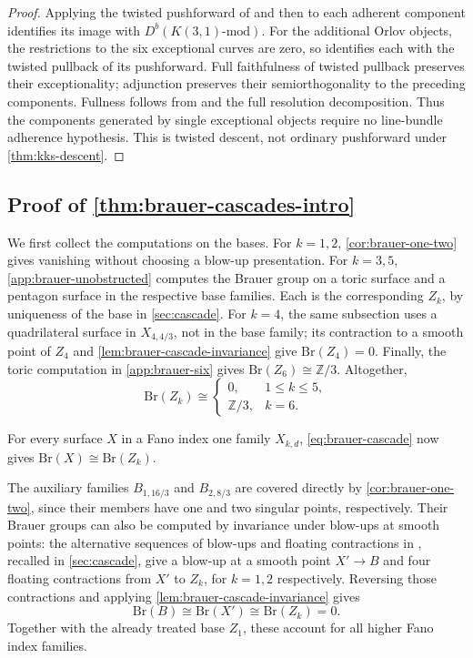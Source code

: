 \documentclass[11pt]{article}
\theoremstyle{plain}
\theoremstyle{definition}
\theoremstyle{remark}
\newcommand{\Z}{\mathbb Z}
\newcommand{\Db}{D^b}
\newcommand{\Br}{\mathrm{Br}}
\begin{document}
\begin{proof}
Applying the twisted pushforward of \cite[equation~(4.14)]{KKS2020}
and then \cite[Theorem~4.19]{KKS2020} to each adherent component
identifies its image with \(\Db(K(3,1)\text{-mod})\).
For the additional Orlov objects, the restrictions to the six
exceptional curves are zero, so \cite[Lemma~4.14]{KKS2020}
identifies each with the twisted pullback of its pushforward.
Full faithfulness of twisted pullback preserves their exceptionality;
adjunction preserves their semiorthogonality to the preceding components.
Fullness follows from \cite[Lemma~4.13]{KKS2020} and the full
resolution decomposition. Thus the components generated by single exceptional objects require no
line-bundle adherence hypothesis. This is twisted descent, not
ordinary pushforward under \cref{thm:kks-descent}.
\end{proof}

\subsection{\texorpdfstring{Proof of \cref{thm:brauer-cascades-intro}}{Proof of Theorem 1.2}}
\label{app:brauer-classification}


We first collect the computations on the bases. For \(k=1,2\),
\cref{cor:brauer-one-two} gives vanishing without choosing a blow-up presentation.
For \(k=3,5\), \cref{app:brauer-unobstructed} computes the Brauer group
on a toric surface and a pentagon surface in the respective base families.
Each is the corresponding \(Z_k\), by uniqueness of the base in
\cref{sec:cascade}. For \(k=4\), the same subsection uses a quadrilateral
surface in \(X_{4,4/3}\), not in the base family; its contraction
to a smooth point of \(Z_4\) and \cref{lem:brauer-cascade-invariance} give
\(\Br(Z_4)=0\). Finally, the toric computation in
\cref{app:brauer-six} gives \(\Br(Z_6)\cong\Z/3\). Altogether,
\[
\Br(Z_k)
\cong
\begin{cases}
0, & 1\leq k\leq5,\\
\Z/3, & k=6.
\end{cases}
\]

For every surface \(X\) in a Fano index one family \(X_{k,d}\),
\eqref{eq:brauer-cascade} now gives \(\Br(X)\cong\Br(Z_k)\).

The auxiliary families \(B_{1,16/3}\) and \(B_{2,8/3}\) are covered
directly by \cref{cor:brauer-one-two}, since their members have one and
two singular points, respectively. Their Brauer groups can also be
computed by invariance under blow-ups at smooth points: the alternative
sequences of blow-ups and floating contractions in \cite[Remark~9]{Corti2016}, recalled in
\cref{sec:cascade}, give a blow-up at a smooth point \(X'\to B\) and four
floating contractions from \(X'\) to \(Z_k\), for \(k=1,2\) respectively.
Reversing those contractions and applying
\cref{lem:brauer-cascade-invariance} gives
\[
\Br(B)\cong\Br(X')\cong\Br(Z_k)=0.
\]
Together with the already treated base \(Z_1\), these account for all
higher Fano index families.
\end{document}
